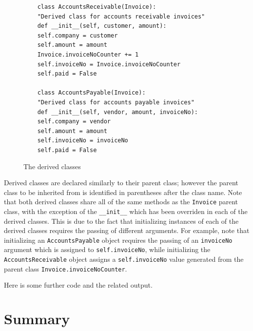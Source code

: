 \documentclass{book}
\begin{document}
\begin{figure}[h]
	\caption{The derived classes}
	\begin{lstlisting}
	class AccountsReceivable(Invoice):
	"Derived class for accounts receivable invoices"
	def __init__(self, customer, amount):
	self.company = customer
	self.amount = amount
	Invoice.invoiceNoCounter += 1
	self.invoiceNo = Invoice.invoiceNoCounter
	self.paid = False
	
	class AccountsPayable(Invoice):
	"Derived class for accounts payable invoices"
	def __init__(self, vendor, amount, invoiceNo):
	self.company = vendor
	self.amount = amount
	self.invoiceNo = invoiceNo
	self.paid = False
	\end{lstlisting}
\end{figure}

Derived classes are declared similarly to their parent class; however the parent class to be inherited from is identified in parentheses after the class name. Note that both derived classes share all of the same methods as the \texttt{Invoice} parent class, with the exception of the \texttt{\_\_init\_\_} which has been overriden in each of the derived classes. This is due to the fact that initializing instances of each of the derived classes requires the passing of different arguments. For example, note that initializing an \texttt{AccountsPayable} object requires the passing of an \texttt{invoiceNo} argument which is assigned to \texttt{self.invoiceNo}, while initializing the \texttt{AccountsReceivable} object assigns a \texttt{self.invoiceNo} value generated from the parent class \texttt{Invoice.invoiceNoCounter}.

Here is some further code and the related output. 

\section{Summary}
\end{document}
